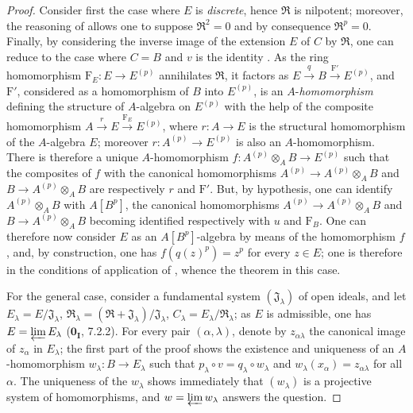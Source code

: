 \begin{proof}
Consider first the case where $E$ is \emph{discrete}, hence $\mathfrak{R}$ is nilpotent; moreover, the reasoning of  allows one to suppose $\mathfrak{R}^2=0$ and by consequence $\mathfrak{R}^p=0$.
Finally, by considering the inverse image of the extension $E$ of $C$ by $\mathfrak{R}$, one can reduce to the case where $C=B$ and $v$ is the identity .
As the ring homomorphism $\mathrm{F}_E:E\to E^{(p)}$ annihilates $\mathfrak{R}$, it factors as $E\xrightarrow{q}B\xrightarrow{\mathrm{F}'}E^{(p)}$, and $\mathrm{F}'$, considered as a homomorphism of $B$ into $E^{(p)}$, is an $A$-\emph{homomorphism} defining the structure of $A$-algebra on $E^{(p)}$ with the help of the composite homomorphism $A\xrightarrow{r} E\xrightarrow{\mathrm{F}_E} E^{(p)}$, where $r:A\to E$ is the structural homomorphism of the $A$-algebra $E$; moreover $r:A^{(p)}\to E^{(p)}$ is also an $A$-homomorphism.
There is therefore a unique $A$-homomorphism $f:A^{(p)}\otimes_A B\to E^{(p)}$ such that the composites of $f$ with the canonical homomorphisms $A^{(p)}\to A^{(p)}\otimes_A B$ and $B\to A^{(p)}\otimes_A B$ are respectively $r$ and $\mathrm{F}'$.
But, by hypothesis, one can identify $A^{(p)}\otimes_A B$ with $A[B^p]$, the canonical homomorphisms $A^{(p)}\to A^{(p)}\otimes_A B$ and $B\to A^{(p)}\otimes_A B$ becoming identified respectively with $u$ and $\mathrm{F}_B$.
One can therefore now consider $E$ as an $A[B^p]$-algebra by means of the homomorphism $f$, and, by construction, one has $f(q(z)^p)=z^p$ for every $z\in E$; one is therefore in the conditions of application of , whence the theorem in this case.

For the general case, consider a fundamental system $(\mathfrak{J}_\lambda)$ of open ideals, and let $E_\lambda=E/\mathfrak{J}_\lambda$, $\mathfrak{R}_\lambda=(\mathfrak{R}+\mathfrak{J}_\lambda)/\mathfrak{J}_\lambda$, $C_\lambda=E_\lambda/\mathfrak{R}_\lambda$; as $E$ is admissible, one has $E=\varprojlim E_\lambda$ ($\mathbf{0_I}$, 7.2.2).
For every pair $(\alpha,\lambda)$, denote by $z_{\alpha\lambda}$ the canonical image of $z_\alpha$ in $E_\lambda$; the first part of the proof shows the existence and uniqueness of an $A$-homomorphism $w_\lambda:B\to E_\lambda$ such that $p_\lambda\circ v=q_\lambda\circ w_\lambda$ and $w_\lambda(x_\alpha)=z_{\alpha\lambda}$ for all $\alpha$.
The uniqueness of the $w_\lambda$ shows immediately that $(w_\lambda)$ is a projective system of homomorphisms, and $w=\varprojlim w_\lambda$ answers the question.
\end{proof}


